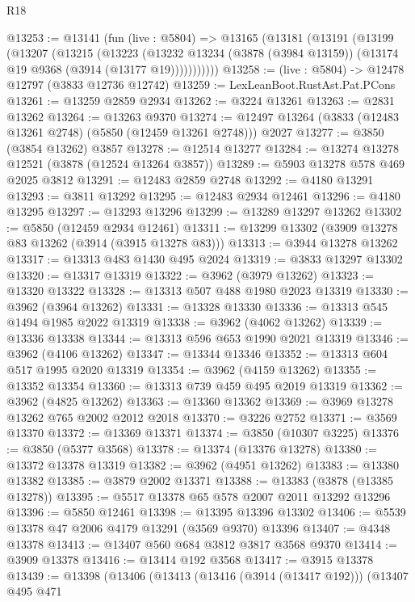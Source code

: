 \begin{lexlean}{R18}
\begin{coremodule}
@13253 := @13141
    (fun (live : @5804) =>
    @13165
      (@13181
        (@13191
          (@13199
            (@13207
              (@13215
                (@13223
                  (@13232
                    @13234
                    (@3878 (@3984 @13159))
                    (@13174 @19 @9368 (@3914 (@13177 @19)))))))))))
@13258 := (live : @5804) -> @12478 @12797 (@3833 @12736 @12742)
@13259 := LexLeanBoot.RustAst.Pat.PCons
@13261 := @13259 @2859 @2934
@13262 := @3224 @13261
@13263 := @2831 @13262
@13264 := @13263 @9370
@13274 := @12497 @13264 (@3833 (@12483 @13261 @2748) (@5850 (@12459 @13261 @2748))) @2027
@13277 := @3850 (@3854 @13262) @3857
@13278 := @12514 @13277
@13284 := @13274 @13278 @12521 (@3878 (@12524 @13264 @3857))
@13289 := @5903 @13278 @578 @469 @2025 @3812
@13291 := @12483 @2859 @2748
@13292 := @4180 @13291
@13293 := @3811 @13292
@13295 := @12483 @2934 @12461
@13296 := @4180 @13295
@13297 := @13293 @13296
@13299 := @13289 @13297 @13262
@13302 := @5850 (@12459 @2934 @12461)
@13311 := @13299 @13302 (@3909 @13278 @83 @13262 (@3914 (@3915 @13278 @83)))
@13313 := @3944 @13278 @13262
@13317 := @13313 @483 @1430 @495 @2024
@13319 := @3833 @13297 @13302
@13320 := @13317 @13319
@13322 := @3962 (@3979 @13262)
@13323 := @13320 @13322
@13328 := @13313 @507 @488 @1980 @2023 @13319
@13330 := @3962 (@3964 @13262)
@13331 := @13328 @13330
@13336 := @13313 @545 @1494 @1985 @2022 @13319
@13338 := @3962 (@4062 @13262)
@13339 := @13336 @13338
@13344 := @13313 @596 @653 @1990 @2021 @13319
@13346 := @3962 (@4106 @13262)
@13347 := @13344 @13346
@13352 := @13313 @604 @517 @1995 @2020 @13319
@13354 := @3962 (@4159 @13262)
@13355 := @13352 @13354
@13360 := @13313 @739 @459 @495 @2019 @13319
@13362 := @3962 (@4825 @13262)
@13363 := @13360 @13362
@13369 := @3969 @13278 @13262 @765 @2002 @2012 @2018
@13370 := @3226 @2752
@13371 := @3569 @13370
@13372 := @13369 @13371
@13374 := @3850 (@10307 @3225)
@13376 := @3850 (@5377 @3568)
@13378 := @13374 (@13376 @13278)
@13380 := @13372 @13378 @13319
@13382 := @3962 (@4951 @13262)
@13383 := @13380 @13382
@13385 := @3879 @2002 @13371
@13388 := @13383 (@3878 (@13385 @13278))
@13395 := @5517 @13378 @65 @578 @2007 @2011 @13292 @13296
@13396 := @5850 @12461
@13398 := @13395 @13396 @13302
@13406 := @5539 @13378 @47 @2006 @4179 @13291 (@3569 @9370) @13396
@13407 := @4348 @13378
@13413 := @13407 @560 @684 @3812 @3817 @3568 @9370
@13414 := @3909 @13378
@13416 := @13414 @192 @3568
@13417 := @3915 @13378
@13439 := @13398
    (@13406
      (@13413
        (@13416 (@3914 (@13417 @192)))
        (@13407
          @495
          @471

\end{coremodule}
\end{lexlean}
